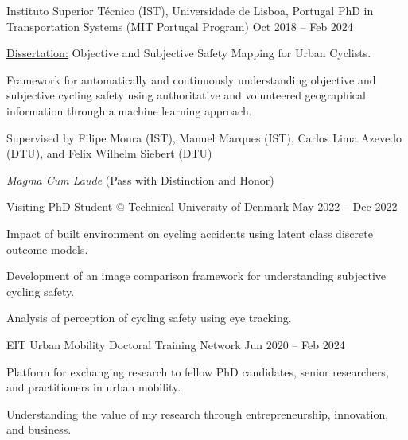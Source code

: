

\begin{cventries}





  \cventry
    {Instituto Superior Técnico (IST), Universidade de Lisboa, Portugal} %
    {PhD in Transportation Systems (MIT Portugal Program)} %
    {Oct 2018 – Feb 2024} %
    {
      \begin{cvitems} %
        \item {\underline{Dissertation:} Objective and Subjective Safety Mapping for Urban Cyclists.}
        \item {Framework for automatically and continuously understanding objective and subjective cycling safety using authoritative and volunteered geographical information through a machine learning approach.}
        \item {Supervised by Filipe Moura (IST), Manuel Marques (IST), Carlos Lima Azevedo (DTU), and Felix Wilhelm Siebert (DTU)}
      \end{cvitems}
    }
    {
        \textit{Magma Cum Laude} (Pass with Distinction and Honor)
    }

  \cventryinner
    {Visiting PhD Student @ Technical University of Denmark} %
    {May 2022 – Dec 2022} %
    {
      \begin{cvitems} %
        \item {Impact of built environment on cycling accidents using latent class discrete outcome models.}
        \item {Development of an image comparison framework for understanding subjective cycling safety.}
        \item {Analysis of perception of cycling safety using eye tracking.}
      \end{cvitems}
    }
    {
    }

  \cventryinner
    {EIT Urban Mobility Doctoral Training Network} %
    {Jun 2020 – Feb 2024} %
    {
      \begin{cvitems} %
        \item {Platform for exchanging research to fellow PhD candidates, senior researchers, and practitioners in urban mobility.}
        \item {Understanding the value of my research through entrepreneurship, innovation, and business.}
      \end{cvitems}
    }
    {
    }


\end{cventries}
